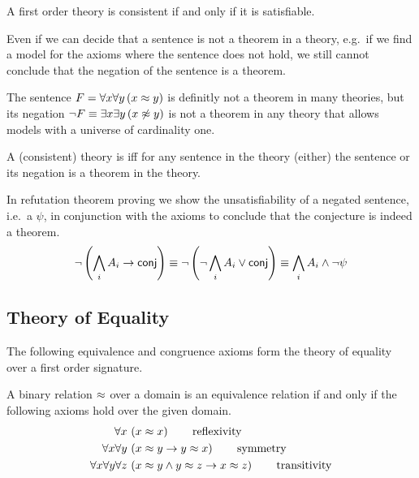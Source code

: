 \begin{lemma}
	A first order theory is consistent if and only if it is satisfiable.
\end{lemma}
%
Even if we can decide that a sentence is not a theorem in a theory,
e.g.~if we find a model for the axioms where the sentence does not hold,
we still cannot conclude that the negation of the sentence is a theorem.
\begin{example}
	The sentence \( F = \forall x \forall y\, (x\approx y) \) is definitly not a theorem in many theories, but its negation \( \lnot F \equiv \exists x \exists y\, (x \not\approx y) \) is not a theorem in any theory that allows models with a universe of cardinality one.
\end{example}
\begin{definition}
	A (consistent) theory is  iff for any sentence in the theory (either) the sentence or its negation is a theorem in the theory.
\end{definition}
%
\begin{remark}
In refutation theorem proving
we show the unsatisfiability
of a negated sentence,
i.e.~a  \( \psi \),
in conjunction with the axioms
to conclude that the conjecture is indeed a theorem.
\[
	\lnot\left(\bigwedge_i A_i \rightarrow \mathsf{conj}\right) \equiv
	\lnot\left(\lnot\bigwedge_i A_i \lor \mathsf{conj}\right) \equiv
	\bigwedge_i A_i \land \lnot \mathsf{\psi}
\]
\end{remark}

\subsection{Theory of Equality}

The following equivalence and congruence axioms form the theory of equality over a first order signature.

\begin{definition}
	[Equivalence] A binary relation \( \approx \) over a domain
	is an equivalence relation if and only if the following axioms hold over the given domain.\label{def:equivalence:axioms}
\begin{align*}
\forall x\,
&\left(x \approx x\right)
\tag*{reflexivity}
\\
\forall x \forall y\,
&\left(x \approx y \rightarrow y \approx x \right)
\tag*{symmetry}
\\
\forall x \forall y \forall z\,
&\left(x \approx y \land y\approx z \rightarrow x\approx z\right)
\tag*{transitivity}
\end{align*}
\end{definition}

